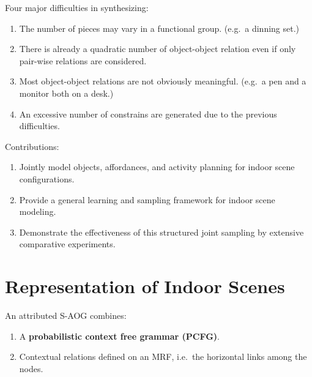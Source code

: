 \documentclass[10pt]{article}
\begin{document}
Four major difficulties in synthesizing:
%
\begin{enumerate}
  \item The number of pieces may vary in a functional group. (e.g.\ a dinning
    set.)
  \item There is already a quadratic number of object-object relation even if
    only pair-wise relations are considered.
  \item Most object-object relations are not obviously meaningful. (e.g.\ a pen
    and a monitor both on a desk.)
  \item An excessive number of constrains are generated due to the previous
    difficulties.
\end{enumerate}

Contributions:
%
\begin{enumerate}
  \item Jointly model objects, affordances, and activity planning for indoor
    scene configurations.
  \item Provide a general learning and sampling framework for indoor scene
    modeling.
  \item Demonstrate the effectiveness of this structured joint sampling by
    extensive comparative experiments.
\end{enumerate}


\section{Representation of Indoor Scenes}%
\label{sec:representation}
An attributed S-AOG combines:
%
\begin{enumerate}
  \item A \textbf{probabilistic context free grammar (PCFG)}.
  \item Contextual relations defined on an MRF, i.e.\ the horizontal links
    among the nodes.
\end{enumerate}
\end{document}
